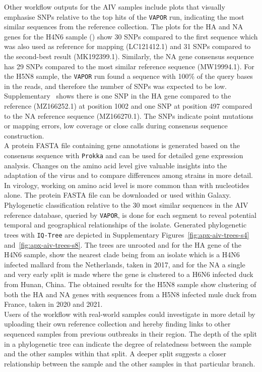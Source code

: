 Other workflow outputs for the \ac{AIV} samples include plots that visually emphasise \acp{SNP} relative to the top hits of the \texttt{VAPOR} run, indicating the most similar sequences from the reference collection. The plots for the \ac{HA} and \ac{NA} genes for the H4N6 sample () show 30 \acp{SNP} compared to the first sequence which was also used as reference for mapping (LC121412.1) and 31 \acp{SNP} compared to the second-best result (MK192399.1). Similarly, the \ac{NA} gene consensus sequence has 29 \acp{SNP} compared to the most similar reference sequence (MW19994.1). For the H5N8 sample, the \texttt{VAPOR} run found a sequence with 100\% of the query bases in the reads, and therefore the number of \acp{SNP} was expected to be low. Supplementary~ shows there is one \ac{SNP} in the \ac{HA} gene compared to the reference (MZ166252.1) at position 1002 and one \ac{SNP} at position 497 compared to the \ac{NA} reference sequence (MZ166270.1). The \acp{SNP} indicate point mutations or mapping errors, low coverage or close calls during consensus sequence construction. \\
A protein FASTA file containing gene annotations is generated based on the consensus sequence with \texttt{Prokka} and can be used for detailed gene expression analysis. Changes on the amino acid level give valuable insights into the adaptation of the virus and to compare differences among strains in more detail. In virology, working on amino acid level is more common than with nucleotides alone. The protein FASTA file can be downloaded or used within Galaxy.\\
Phylogenetic classification relative to the 30 most similar sequences in the \ac{AIV} reference database, queried by \texttt{VAPOR}, is done for each segment to reveal potential temporal and geographical relationships of the isolate. Generated phylogenetic trees with \texttt{IQ-Tree} are depicted in Supplementary Figures~\ref{fig:apx-aiv-trees-s4} and~\ref{fig:apx-aiv-trees-s8}. The trees are unrooted and for the \ac{HA} gene of the H4N6 sample, show the nearest clade being from an isolate which is a H4N6 infected mallard from the Netherlands, taken in 2017, and for the \ac{NA} a single and very early split is made where the gene is clustered to a H6N6 infected duck from Hunan, China. The obtained results for the H5N8 sample show clustering of both the \ac{HA} and \ac{NA} genes with sequences from a H5N8 infected mule duck from France, taken in 2020 and 2021.\\
Users of the workflow with real-world samples could investigate in more detail by uploading their own reference collection and hereby finding links to other sequenced samples from previous outbreaks in their region. The depth of the split in a phylogenetic tree can indicate the degree of relatedness between the sample and the other samples within that split. A deeper split suggests a closer relationship between the sample and the other samples in that particular branch.

